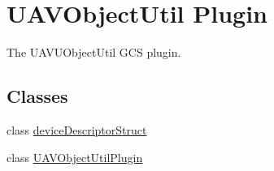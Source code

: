 \hypertarget{group___u_a_v_object_util_plugin}{\section{\-U\-A\-V\-Object\-Util \-Plugin}
\label{group___u_a_v_object_util_plugin}
}


\-The \-U\-A\-V\-U\-Object\-Util \-G\-C\-S plugin.  


\subsection*{\-Classes}
\begin{DoxyCompactItemize}
\item 
class \hyperlink{classdevice_descriptor_struct}{device\-Descriptor\-Struct}
\item 
class \hyperlink{class_u_a_v_object_util_plugin}{\-U\-A\-V\-Object\-Util\-Plugin}
\end{DoxyCompactItemize}
